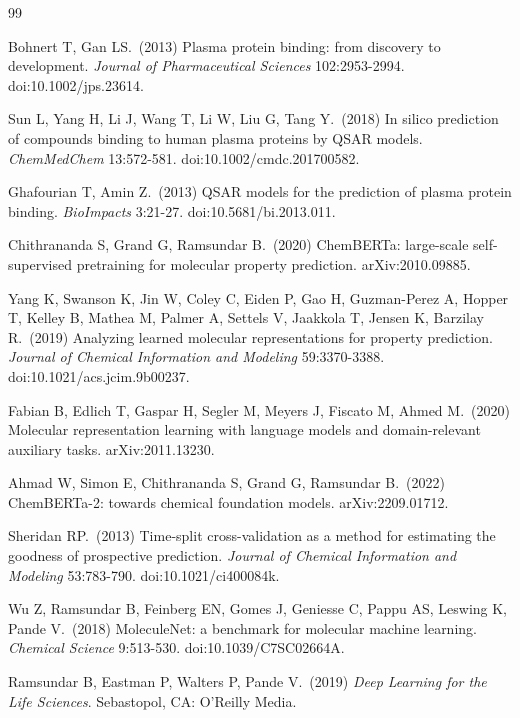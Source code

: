 \begin{thebibliography}{99}

Bohnert T, Gan LS.\ (2013)
Plasma protein binding: from discovery to development.
\emph{Journal of Pharmaceutical Sciences} 102:2953-2994.
doi:10.1002/jps.23614.

Sun L, Yang H, Li J, Wang T, Li W, Liu G, Tang Y.\ (2018)
In silico prediction of compounds binding to human plasma proteins by QSAR models.
\emph{ChemMedChem} 13:572-581.
doi:10.1002/cmdc.201700582.

Ghafourian T, Amin Z.\ (2013)
QSAR models for the prediction of plasma protein binding.
\emph{BioImpacts} 3:21-27.
doi:10.5681/bi.2013.011.

Chithrananda S, Grand G, Ramsundar B.\ (2020)
ChemBERTa: large-scale self-supervised pretraining for molecular property prediction.
arXiv:2010.09885.

Yang K, Swanson K, Jin W, Coley C, Eiden P, Gao H, Guzman-Perez A, Hopper T, Kelley B, Mathea M, Palmer A, Settels V, Jaakkola T, Jensen K, Barzilay R.\ (2019)
Analyzing learned molecular representations for property prediction.
\emph{Journal of Chemical Information and Modeling} 59:3370-3388.
doi:10.1021/acs.jcim.9b00237.

Fabian B, Edlich T, Gaspar H, Segler M, Meyers J, Fiscato M, Ahmed M.\ (2020)
Molecular representation learning with language models and domain-relevant auxiliary tasks.
arXiv:2011.13230.

Ahmad W, Simon E, Chithrananda S, Grand G, Ramsundar B.\ (2022)
ChemBERTa-2: towards chemical foundation models.
arXiv:2209.01712.

Sheridan RP.\ (2013)
Time-split cross-validation as a method for estimating the goodness of prospective prediction.
\emph{Journal of Chemical Information and Modeling} 53:783-790.
doi:10.1021/ci400084k.

Wu Z, Ramsundar B, Feinberg EN, Gomes J, Geniesse C, Pappu AS, Leswing K, Pande V.\ (2018)
MoleculeNet: a benchmark for molecular machine learning.
\emph{Chemical Science} 9:513-530.
doi:10.1039/C7SC02664A.

Ramsundar B, Eastman P, Walters P, Pande V.\ (2019)
\emph{Deep Learning for the Life Sciences}.
Sebastopol, CA: O'Reilly Media.


\end{thebibliography}
